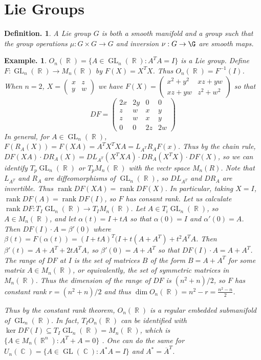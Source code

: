 \documentclass[11pt, a4paper]{memoir}
\DeclareMathOperator{\R}{{\mathbb{R}}}
\DeclareMathOperator{\C}{{\mathbb{C}}}
\theoremstyle{change}
\theoremstyle{plain}
\theoremstyle{nonumberplain}
\newtheorem{definition}{Definition.}
\newtheorem{example}{Example.}
\DeclareMathOperator{\GL}{GL}
\DeclareMathOperator{\rank}{rank}
\numberwithin{equation}{section}
\begin{document}
\section{Lie Groups}
\begin{definition}
    A Lie group $G$ is both a smooth manifold and a group such that the group operations $\mu:G\times G\to G$ and inversion $\nu:G\to\G$ are smooth maps.
\end{definition}
\begin{example}
    $O_n(\R)=\{A\in\GL_n(\R):A^TA=I\}$ is a Lie group.
    Define $F:\GL_n(\R)\to M_n(\R)$ by $F(X)=X^TX$.
    Thus $O_n(\R)=F^{-1}(I)$.
    When $n=2$, $X=\begin{pmatrix}x&z\\y&w\end{pmatrix}$ we have $F(X)=\begin{pmatrix}x^2+y^2&xz+yw\\xz+yw&z^2+w^2\end{pmatrix}$ so that
    \begin{equation*}
        DF =
        \begin{pmatrix}
            2x & 2y & 0 & 0\\
            z & w & x & y\\
            z & w & x & y\\
            0 & 0 & 2z & 2w
        \end{pmatrix}
    \end{equation*}
    In general, for $A\in\GL_n(\R)$, $F(R_A(X))=F(XA)=A^TX^TXA=L_{A^T}R_AF(x)$.
    Thus by the chain rule, $DF(XA)\cdot DR_A(X)=DL_{A^T}(X^TXA)\cdot DR_A(X^TX)\cdot DF(X)$, so we can identify $T_p\GL_n(\R)$ or $T_pM_n(\R)$ with the vectr space $M_n(R)$.
    Note that $L_{A^T}$ and $R_A$ are diffeomorphisms of $\GL_n(\R)$, so $DL_{A^T}$ and $DR_A$ are invertible.
    Thus $\rank DF(XA)=\rank DF(X)$.
    In particular, taking $X=I$, $\rank DF(A)=\rank DF(I)$, so $F$ has consant rank.
    Let us calculate $\rank DF:T_I\GL_n(\R)\to T_IM_n(\R)$.
    Let $A\in T_i\GL_n(\R)$, so $A\in M_n(\R)$, and let $\alpha(t)=I+tA$ so that $\alpha(0)=I$ and $\alpha'(0)=A$.
    Then $DF(I)\cdot A=\beta'(0)$ where $\beta(t)=F(\alpha(t))=(I+tA)^T(I+t(A+A^T)+t^2A^TA$.
    Then $\beta'(t)=A+A^T+2tA^TA$, so $\beta'(0)=A+A^T$ so that $DF(I)\cdot A=A+A^T$.
    The range of $DF$ at $I$ is the set of matrices $B$ of the form $B=A+A^T$ for some matrix $A\in M_n(\R)$, or equivalently, the set of symmetric matrices in $M_n(\R)$.
    Thus the dimension of the range of $DF$ is $(n^2+n)/2$, so $F$ has constant rank $r=(n^2+n)/2$ and thus $\dim O_n(\R)=n^2-r=\frac{n^2-n}{2}$.

    Thus by the constant rank theorem, $O_n(\R)$ is a regular embedded submanifold of $\GL_n(\R)$.
    In fact, $T_IO_n(\R)$ can be identified with $\ker DF(I)\subseteq T_I\GL_n(\R)=M_n(\R)$, which is $\{A\in M_n(\R^n):A^T+A=0\}$ .
    One can do the same for $U_n(\C)=\{A\in\GL(\C):A^*A=I\}$ and $A^*=\overline{A}^T$.
\end{example}
\end{document}
